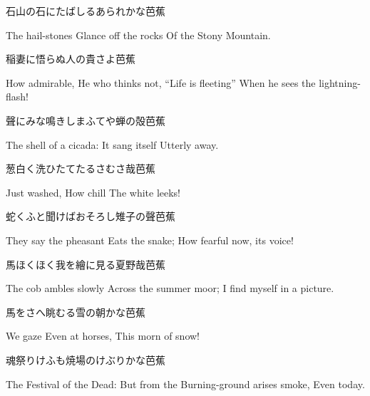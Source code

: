 \begin{haiku}
    {\FH 石山の石にたばしるあられかな}\hfill{\FH 芭蕉}

    \vin{} The hail-stones
    \vin{} \vin{} Glance off the rocks
    \vin{} \vin{} \vin{} Of the Stony Mountain.
\end{haiku}

\begin{haiku}
    {\FH 稲妻に悟らぬ人の貴さよ}\hfill{\FH 芭蕉}

    \vin{} How admirable,
    \vin{} \vin{} He who thinks not, ``Life is fleeting''
    \vin{} \vin{} \vin{} When he sees the lightning-flash!
\end{haiku}

\begin{haiku}
    {\FH 聲にみな鳴きしまふてや蝉の殻}\hfill{\FH 芭蕉}

    \vin{} The shell of a cicada:
    \vin{} \vin{} It sang itself
    \vin{} \vin{} \vin{} Utterly away.
\end{haiku}

\begin{haiku}
    {\FH 葱白く洗ひたてたるさむさ哉}\hfill{\FH 芭蕉}

    \vin{} Just washed,
    \vin{} \vin{} How chill
    \vin{} \vin{} \vin{} The white leeks!
\end{haiku}

\begin{haiku}
    {\FH 蛇くふと聞けばおそろし雉子の聲}\hfill{\FH 芭蕉}

    \vin{} They say the pheasant
    \vin{} \vin{} Eats the snake;
    \vin{} \vin{} \vin{} How fearful now, its voice!
\end{haiku}

\begin{haiku}
    {\FH 馬ほくほく我を繪に見る夏野哉}\hfill{\FH 芭蕉}

    \vin{} The cob ambles slowly
    \vin{} \vin{} Across the summer moor;
    \vin{} \vin{} \vin{} I find myself in a picture.
\end{haiku}

\begin{haiku}
    {\FH 馬をさへ眺むる雪の朝かな}\hfill{\FH 芭蕉}

    \vin{} We gaze
    \vin{} \vin{} Even at horses,
    \vin{} \vin{} \vin{} This morn of snow!
\end{haiku}

\begin{haiku}
    {\FH 魂祭りけふも焼場のけぶりかな}\hfill{\FH 芭蕉}

    \vin{} The Festival of the Dead:
    \vin{} \vin{} But from the Burning-ground arises smoke,
    \vin{} \vin{} \vin{} Even today.
\end{haiku}

